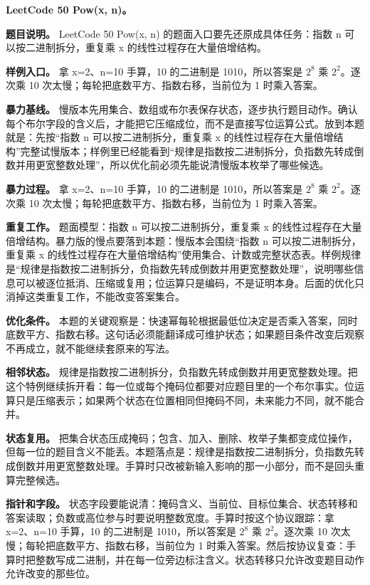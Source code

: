 \noindent\textbf{LeetCode 50 Pow(x, n)。}

\textbf{题目说明。} LeetCode 50 Pow(x, n) 的题面入口要先还原成具体任务：指数 n 可以按二进制拆分，重复乘 x 的线性过程存在大量倍增结构。

\textbf{样例入口。} 拿 x=2、n=10 手算，10 的二进制是 1010，所以答案是 \ensuremath{2^{8}} 乘 \ensuremath{2^{2}}。逐次乘 10 次太慢；每轮把底数平方、指数右移，当前位为 1 时乘入答案。

\textbf{暴力基线。} 慢版本先用集合、数组或布尔表保存状态，逐步执行题目动作。确认每个布尔字段的含义后，才能把它压缩成位，而不是直接写位运算公式。放到本题就是：先按“指数 n 可以按二进制拆分，重复乘 x 的线性过程存在大量倍增结构”完整试慢版本；样例里已经能看到“规律是指数按二进制拆分，负指数先转成倒数并用更宽整数处理”，所以优化前必须先能说清慢版本枚举了哪些候选。

\textbf{暴力过程。} 拿 x=2、n=10 手算，10 的二进制是 1010，所以答案是 \ensuremath{2^{8}} 乘 \ensuremath{2^{2}}。逐次乘 10 次太慢；每轮把底数平方、指数右移，当前位为 1 时乘入答案。

\textbf{重复工作。} 题面模型：指数 n 可以按二进制拆分，重复乘 x 的线性过程存在大量倍增结构。暴力版的慢点要落到本题：慢版本会围绕“指数 n 可以按二进制拆分，重复乘 x 的线性过程存在大量倍增结构”使用集合、计数或完整状态表。样例规律是“规律是指数按二进制拆分，负指数先转成倒数并用更宽整数处理”，说明哪些信息可以被逐位抵消、压缩或复用；位运算只是编码，不是证明本身。后面的优化只消掉这类重复工作，不能改变答案集合。

\textbf{优化条件。} 本题的关键观察是：快速幂每轮根据最低位决定是否乘入答案，同时底数平方、指数右移。这句话必须能翻译成可维护状态；如果题目条件改变后观察不再成立，就不能继续套原来的写法。

\textbf{相邻状态。} 规律是指数按二进制拆分，负指数先转成倒数并用更宽整数处理。把这个特例继续拆开看：每一位或每个掩码位都要对应题目里的一个布尔事实。位运算只是压缩表示；如果两个状态在位置相同但掩码不同，未来能力不同，就不能合并。

\textbf{状态复用。} 把集合状态压成掩码；包含、加入、删除、枚举子集都变成位操作，但每一位的题目含义不能丢。本题落点是：规律是指数按二进制拆分，负指数先转成倒数并用更宽整数处理。手算时只改被新输入影响的那一小部分，而不是回头重算完整候选。

\textbf{指针和字段。} 状态字段要能说清：掩码含义、当前位、目标位集合、状态转移和答案读取；负数或高位参与时要说明整数宽度。手算时按这个协议跟踪：拿 x=2、n=10 手算，10 的二进制是 1010，所以答案是 \ensuremath{2^{8}} 乘 \ensuremath{2^{2}}。逐次乘 10 次太慢；每轮把底数平方、指数右移，当前位为 1 时乘入答案。然后按协议复查：手算时把整数写成二进制，并在每一位旁边标注含义。状态转移只允许改变题目动作允许改变的那些位。

